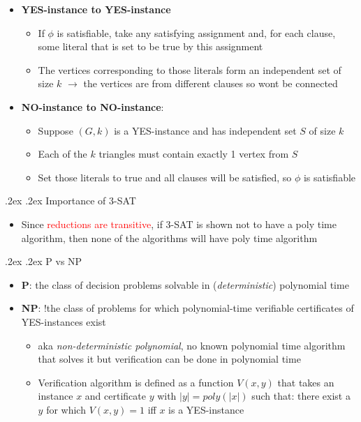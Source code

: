 \documentclass[10pt,landscape,a4paper]{article}
\makeatletter
\renewcommand{\subsection}{\@startsection{subsection}{1}{0mm}%
    {.2ex}%
    {.2ex}%
    {\sffamily\bfseries}}
\makeatother
\begin{document}
\begin{multicols*}{4}
\begin{itemize}
		\item \textbf{YES-instance to YES-instance}
		      \begin{itemize}
			      \item If $\phi$ is satisfiable, take any satisfying assignment and, for each clause, some literal that is set to be true by this assignment
			      \item The vertices corresponding to those literals form an independent set of size $k$ $\rightarrow$ the vertices are from different clauses so wont be connected
		      \end{itemize}
		\item \textbf{NO-instance to NO-instance}: \begin{itemize}
			      \item Suppose $(G, k)$ is a YES-instance and has independent set $S$ of size $k$
			      \item Each of the $k$ triangles must contain exactly 1 vertex from $S$
			      \item Set those literals to true and all clauses will be satisfied, so $\phi$ is satisfiable
		      \end{itemize}
	\end{itemize}
	\subsection{Importance of 3-SAT}
	\begin{itemize}
		\item Since \textcolor{red}{reductions are transitive}, if 3-SAT is shown not to have a poly time algorithm, then none of the algorithms will have poly time algorithm
	\end{itemize}
	\subsection{P vs NP}
	\begin{itemize}
		\item \textbf{P}: the class of decision problems solvable in (\textit{deterministic}) polynomial time
		\item \textbf{NP}: !the class of problems for which polynomial-time verifiable certificates of YES-instances
		      exist
		      \begin{itemize}
			      \item aka \textit{non-deterministic polynomial}, no known polynomial time algorithm that solves it but verification can be done in polynomial time
			      \item Verification algorithm is defined as a function $V(x,y)$ that takes an instance $x$ and certificate $y$ with $|y|=poly(|x|)$ such that: there exist a $y$ for which $V(x,y)=1$ iff $x$ is a YES-instance
		      \end{itemize}
	\end{itemize}

\end{multicols*}
\end{document}
